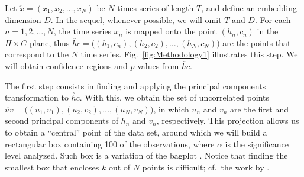 Let $\utilde{x} =(x_1, x_2, \dots, x_N)$ be $N$ times series of length $T$, and define an embedding dimension $D$.
In the sequel, whenever possible, we will omit $T$ and $D$.
For each $n=1,2,\dots, N$, the time series $x_n$ is mapped onto the point $(h_n,c_n)$ in the $H\times C$ plane, thus $\utilde{hc}=\big((h_1,c_n), (h_2,c_2), \dots, (h_N,c_N)\big)$ are the points that correspond to the $N$ time series.
Fig.~\ref{fig:Methodology1} illustrates this step.
We will obtain confidence regions and $p$-values from $\utilde{hc}$.

The first step consists in finding and applying the principal components transformation to $\utilde{hc}$.
With this, we obtain the set of uncorrelated points $\utilde{uv}=\big((u_1,v_1), (u_2,v_2),\dots,(u_N,v_N)\big)$, in which $u_n$ and $v_n$ are the first and second principal components of $h_n$ and $v_n$, respectively.
This projection allows us to obtain a ``central'' point of the data set, around which we will build a rectangular box containing \SI{100}{\minusalphapercent} of the observations, where $\alpha$ is the significance level analyzed.
Such box is a variation of the bagplot \citep{TheBagplotaBivariateBoxplot}.
Notice that finding the smallest box that encloses $k$ out of $N$ points is difficult; cf.\ the work by \citet{SmallestKEnclosingRectangleRevisited}.

